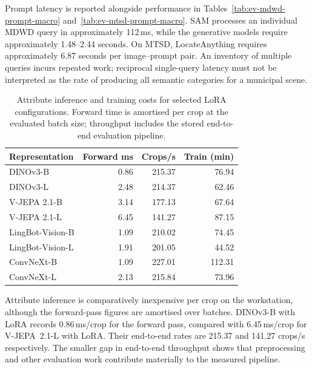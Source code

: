 Prompt latency is reported alongside performance in Tables~\ref{tab:ev-mdwd-prompt-macro} and~\ref{tab:ev-mtsd-prompt-macro}. SAM processes an individual MDWD query in approximately 112\,ms, while the generative models require approximately 1.48--2.44 seconds. On MTSD, LocateAnything requires approximately 6.87 seconds per image--prompt pair. An inventory of multiple queries incurs repeated work; reciprocal single-query latency must not be interpreted as the rate of producing all semantic categories for a municipal scene.

\begin{table}[htbp]
\centering
\small
\caption{Attribute inference and training costs for selected LoRA configurations. Forward time is amortised per crop at the evaluated batch size; throughput includes the stored end-to-end evaluation pipeline.}
\label{tab:ev-attribute-runtime}
\renewcommand{\arraystretch}{1.15}
\begin{tabularx}{\textwidth}{@{}>{\raggedright\arraybackslash}Xrrr@{}}
\toprule
Representation & Forward ms & Crops/s & Train (min) \\
\midrule
DINOv3-B & 0.86 & 215.37 & 76.94 \\
DINOv3-L & 2.48 & 214.37 & 62.46 \\
V-JEPA 2.1-B & 3.14 & 177.13 & 67.64 \\
V-JEPA 2.1-L & 6.45 & 141.27 & 87.15 \\
LingBot-Vision-B & 1.09 & 210.02 & 74.45 \\
LingBot-Vision-L & 1.91 & 201.05 & 44.52 \\
ConvNeXt-B & 1.09 & 227.01 & 112.31 \\
ConvNeXt-L & 2.13 & 215.84 & 73.96 \\
\bottomrule
\end{tabularx}
\end{table}


Attribute inference is comparatively inexpensive per crop on the workstation, although the forward-pass figures are amortised over batches. DINOv3-B with \gls{LoRA} records 0.86\,ms/crop for the forward pass, compared with 6.45\,ms/crop for V-JEPA~2.1-L with \gls{LoRA}. Their end-to-end rates are 215.37 and 141.27 crops/s respectively. The smaller gap in end-to-end throughput shows that preprocessing and other evaluation work contribute materially to the measured pipeline.

